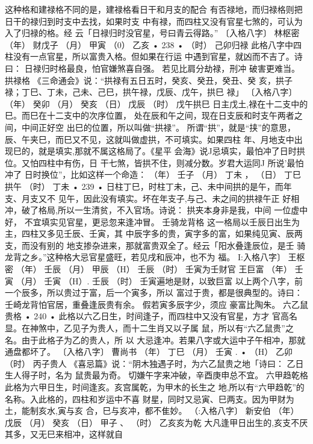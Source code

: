 这种格和建禄格不同的是，建禄格看日干和月支的配合
有否禄地，而归禄格则把日干的禄归到时支中去找，如果时支
中有禄，而四柱又没有官星七煞的，可认为入了归禄的格。经
云「日禄归时没官星，号曰青云得路。”
〔入格八字〕 林枢密
（年） 财戊子
（月） 甲寅
（0） 乙亥
• 238 •
（时） 己卯归禄
此格八字中四柱没有一点官星，所以富贵入格。但如果在行运
中遇到官星，就凶而不吉了。诗曰：
日禄归时格最良，怕官嫌煞喜自强。
若见比肩分劫禄，刑冲 破害更难当。
拱禄格
《三命通会》说：“拱禄有五日五时，癸亥、癸丑，癸丑、癸
亥，拱子禄；丁巳、丁未，己未、己巳，拱午禄，戊辰、戊午，拱巳
禄」
〔入格八字〕
（年） 癸卯
（月） 癸亥
（日） 戊辰
（时） 戊午拱巳
日主戊土,禄在十二支中的巳。而巳在十二支中的次序位置，
处在辰和午之间，现在日支辰和时支午两者之间，中间正好空
出巳的位置，所以叫做“拱禄”。 所谓“拱”，就是“挟”的意思，
辰、午夹巳，而巳又不见，这就叫做虚拱，不可填实。如果四柱
年、月地支中出现巳的，就是填实,那就不属这格局了。《星平
会海》说J忌填实，最怕冲了日时拱位。又怕四柱中有伤，日
干七煞，皆拱不住，则减分数。岁君大运同J 所说'最怕冲了
日时换位”，比如这样一个命造：
（年） 壬子
（月） 丁未 ，
（日） 丁巳拱午
（时） 丁未
• 239 •
日柱丁巳，时柱丁未，己、未中间拱的是午，而年支、月支又不
见午，因此没有填实。坏在年支子,与己、未之间的拱禄午正
好相冲，破了格局,所以一生清贫，不入官场。诗说：
拱夹本身非是我，中间 一位虚中好，
不宜填实见官星，更忌忽来逢冲冒。
壬骑龙背格
这一格局以壬辰日出生为主，四柱又多见壬辰、壬寅，其
中辰字多的贵，寅字多的富，如果纯见寅、辰两支，而没有别的
地支掺杂进来，那就富贵双全了。经云「阳水叠逢辰位，是壬
骑龙背之乡。”这种格大忌官星盛旺，若见戌和辰冲，也不为
福。
I:入格八字〕 王枢密
（年） 壬辰
（月） 甲辰
（H） 壬辰
（时） 壬寅为壬财官
王巨富
（年） 壬寅
（月） 壬寅
（H）. 壬辰
（时） 壬寅遍地是财，以致巨富
以上两个八字，前一个辰多，所以贵过于富，后一个寅多，所以
富过于贵，都是很典型的。诗曰：
壬崎龙背怕官居，重叠逢辰贵有余。
假若寅多辰字少，须应 豪富比陶朱。
六乙鼠贵格
• 240 •
此格以六乙日生，时间逢子，而四柱中又没有官星，方才
官高名显。在神煞中，乙见子为贵人，而十二生肖又以子属
鼠，所以有“六乙鼠贵”之名。由于此格子为乙的贵人，所 以
大忌逢冲。若果八字或大运中子午相冲，那就通盘都坏了。
〔入格八字〕 曹尚书
（年） 丁巳
（月） 壬寅 .
•
（H） 乙卯
（时） 丙子贵人
《喜忌篇》说：“阴木独遇子时，为六乙鼠贵之地「诗曰：
乙日生人得子时，名为 鼠贵最为奇。
切嫌午字来冲破，辛酉庚申总不宜。
六甲趋乾格
此格为六甲日生，时间逢亥。亥宫属乾，为甲木的长生之
地,所以有“六甲趋乾”的名称。入此格的，四柱和岁运中不喜
财星，同时又忌寅、巳两支。因为甲财为土，能制亥水,寅与亥
合，巳与亥冲，都不隹妙。
（:入格八字〕 新安伯
（年） 戊辰
（月） 癸亥
（日） 甲子 、
（时） 乙亥亥为乾
大凡逢甲日出生的,亥支不厌其多，又无巳来相冲，这样就自
